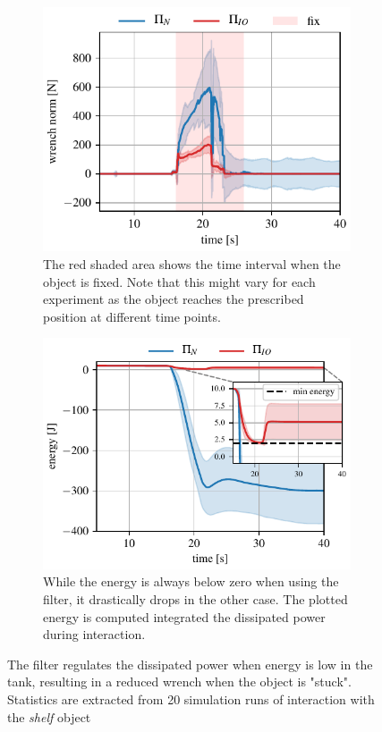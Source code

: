 \begin{figure}[t]
\centering
\hspace*{-0.0cm} 
\begin{subfigure}{0.8\columnwidth}
    \includegraphics[width=\linewidth]{figures/fix_experiment/wrench_with_without_tank.pdf}
    \caption{The red shaded area shows the time interval when the object is fixed. Note that this might vary for each experiment as the object reaches the prescribed position at different time points.}
\end{subfigure}
\hspace*{-0.0cm} 
\begin{subfigure}{0.8\columnwidth}
    \includegraphics[width=\linewidth]{figures/fix_experiment/energy_with_without_tank.pdf}
    \caption{While the energy is always below zero when using the filter, it drastically drops in the other case. The plotted energy is computed integrated the dissipated power during interaction.}
\end{subfigure}
\hfill
\caption{The filter regulates the dissipated power when energy is low in the tank, resulting in a reduced wrench when the object is "stuck". Statistics are extracted from 20 simulation runs of interaction with the \textit{shelf} object}\label{fig:tank_comparison}
\end{figure}

